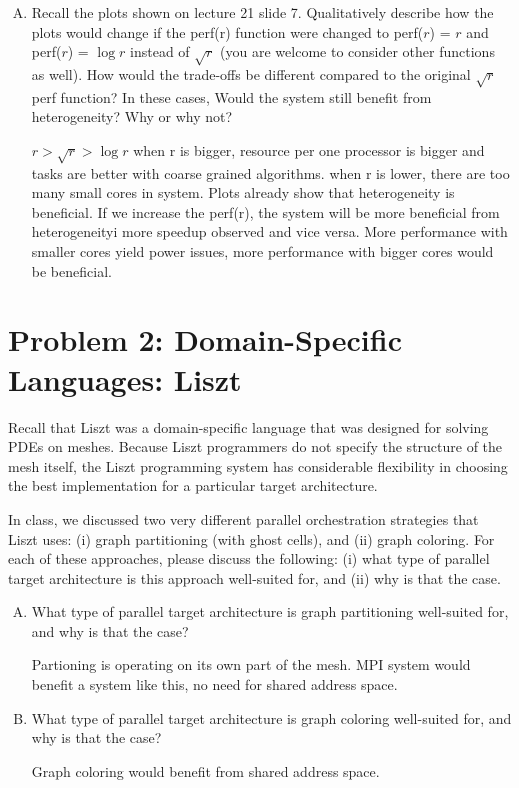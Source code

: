 \documentclass[11pt]{article}
\newenvironment{choice}{\begin{enumerate}[A.]}{\end{enumerate}}
\newenvironment{answer}{\begin{minipage}[c][1.5in]{\textwidth}}{\end{minipage}}
\begin{document}
\begin{choice}
\item Recall the plots shown on lecture 21 slide 7. Qualitatively describe how the plots would change if the perf(r) function were changed to perf($r$) = $r$ and perf($r$) = $\log r$ instead of $\sqrt{r}$ (you are welcome to consider other functions as well). How would the trade-offs be different compared to the original $\sqrt{r}$ perf function? In these cases, Would the system still benefit from heterogeneity?  Why or why not?

\begin{answer}
$r > \sqrt{r} > \log r $
when r is bigger, resource per one processor is bigger and tasks are better with coarse grained algorithms. \newline
when r is lower, there are too many small cores in system. \newline
Plots already show that heterogeneity is beneficial. \newline
If we increase the perf(r), the system will be more beneficial from heterogeneityi more speedup observed and vice versa.
More performance with smaller cores yield power issues, more performance with bigger cores would be beneficial. \newline
\end{answer}

\end{choice}
\newpage 

\section*{Problem 2: Domain-Specific Languages: Liszt}
Recall that Liszt was a domain-specific language that was designed for solving PDEs on meshes. Because Liszt programmers do not specify the structure of the mesh itself, the Liszt programming system has considerable flexibility in choosing the best implementation for a particular target architecture. 

In class, we discussed two very different parallel orchestration strategies that Liszt uses: (i) graph partitioning (with ghost cells), and (ii) graph coloring. For each of these approaches, please discuss the following: (i) what type of parallel target architecture is this approach well-suited for, and (ii) why is that the case.
\begin{choice}
\item What type of parallel target architecture is graph partitioning well-suited for, and why is that the case?

\begin{answer}
Partioning is operating on its own part of the mesh. MPI system would benefit a system like this, no need for shared address space.

\end{answer}
\item What type of parallel target architecture is graph coloring well-suited for, and why is that the case?
\begin{answer}
Graph coloring would benefit from shared address space.
\end{answer}
\end{choice}
\end{document}
